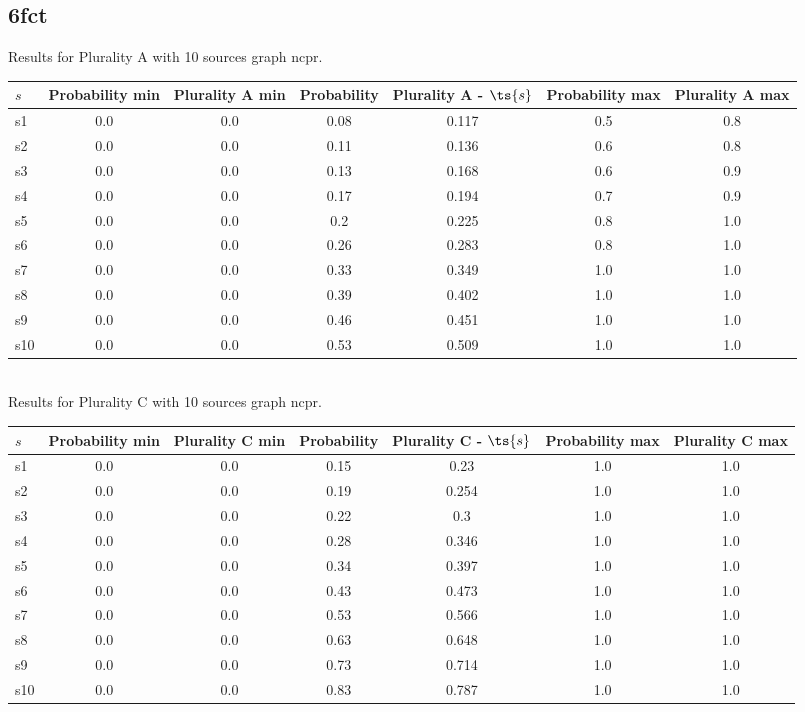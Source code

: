 \documentclass{article}
\begin{document}
\newpage

\subsection{6fct}

\noindent Results for Plurality A with 10 sources graph ncpr.

\noindent\begin{tabular}{|l|c|c|c|c|c|c|}
\hline
$s$& Probability min & Plurality A min & Probability & Plurality A - $\ts{s}$ & Probability max & Plurality A max\\
\hline
s1 &0.0 & 0.0 & 0.08 & 0.117 & 0.5 & 0.8\\
\hline
s2 &0.0 & 0.0 & 0.11 & 0.136 & 0.6 & 0.8\\
\hline
s3 &0.0 & 0.0 & 0.13 & 0.168 & 0.6 & 0.9\\
\hline
s4 &0.0 & 0.0 & 0.17 & 0.194 & 0.7 & 0.9\\
\hline
s5 &0.0 & 0.0 & 0.2 & 0.225 & 0.8 & 1.0\\
\hline
s6 &0.0 & 0.0 & 0.26 & 0.283 & 0.8 & 1.0\\
\hline
s7 &0.0 & 0.0 & 0.33 & 0.349 & 1.0 & 1.0\\
\hline
s8 &0.0 & 0.0 & 0.39 & 0.402 & 1.0 & 1.0\\
\hline
s9 &0.0 & 0.0 & 0.46 & 0.451 & 1.0 & 1.0\\
\hline
s10 &0.0 & 0.0 & 0.53 & 0.509 & 1.0 & 1.0\\
\hline
\end{tabular}\\

\noindent Results for Plurality C with 10 sources graph ncpr.

\noindent\begin{tabular}{|l|c|c|c|c|c|c|}
\hline
$s$& Probability min & Plurality C min & Probability & Plurality C - $\ts{s}$ & Probability max & Plurality C max\\
\hline
s1 &0.0 & 0.0 & 0.15 & 0.23 & 1.0 & 1.0\\
\hline
s2 &0.0 & 0.0 & 0.19 & 0.254 & 1.0 & 1.0\\
\hline
s3 &0.0 & 0.0 & 0.22 & 0.3 & 1.0 & 1.0\\
\hline
s4 &0.0 & 0.0 & 0.28 & 0.346 & 1.0 & 1.0\\
\hline
s5 &0.0 & 0.0 & 0.34 & 0.397 & 1.0 & 1.0\\
\hline
s6 &0.0 & 0.0 & 0.43 & 0.473 & 1.0 & 1.0\\
\hline
s7 &0.0 & 0.0 & 0.53 & 0.566 & 1.0 & 1.0\\
\hline
s8 &0.0 & 0.0 & 0.63 & 0.648 & 1.0 & 1.0\\
\hline
s9 &0.0 & 0.0 & 0.73 & 0.714 & 1.0 & 1.0\\
\hline
s10 &0.0 & 0.0 & 0.83 & 0.787 & 1.0 & 1.0\\
\hline
\end{tabular}\\
\end{document}
